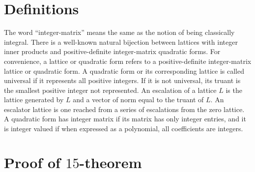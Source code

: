 \documentclass{article}
\begin{document}
\section{Definitions}
The word ``integer-matrix'' means the same as the notion of being classically integral. There is a well-known natural bijection between lattices with integer inner products and positive-definite integer-matrix quadratic forms. For convenience, a lattice or quadratic form refers to a positive-definite integer-matrix lattice or quadratic form. A quadratic form or its corresponding lattice is called universal if it represents all positive integers. If it is not universal, its truant is the smallest positive integer not represented. An escalation of a lattice $L$ is the lattice generated by $L$ and a vector of norm equal to the truant of $L$. An escalator lattice is one reached from a series of escalations from the zero lattice. A quadratic form has integer matrix if its matrix has only integer entries, and it is integer valued if when expressed as a polynomial, all coefficients are integers.

\section{Proof of $15$-theorem}
\end{document}
